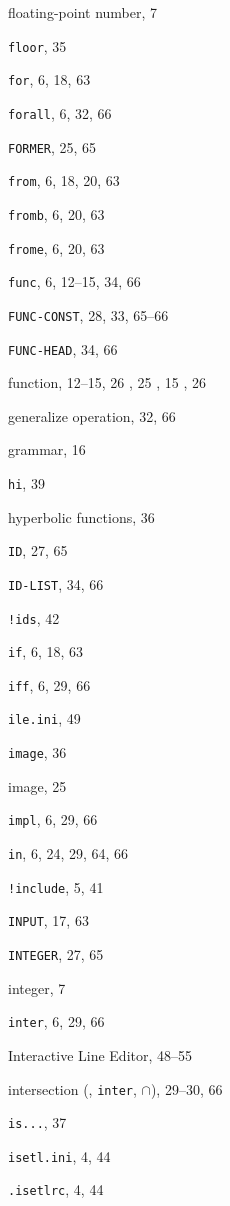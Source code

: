 \begin{theindex}
\item {floating-point number}, 7
\item {{\tt floor}}, 35
\item {{\tt for}}, 6, 18, 63
\item {{\tt forall}}, 6, 32, 66
\item {{\tt FORMER}}, 25, 65
\item {{\tt from}}, 6, 18, 20, 63
\item {{\tt fromb}}, 6, 20, 63
\item {{\tt frome}}, 6, 20, 63
\item {{\tt func}}, 6, 12--15, 34, 66
\item {{\tt FUNC-CONST}}, 28, 33, 65--66
\item {{\tt FUNC-HEAD}}, 34, 66
\item {function}, 12--15, 26
	, 25
	, 15
	, 26
\indexspace
\item {generalize operation}, 32, 66
\item {grammar}, 16
\indexspace
\item {{\tt hi}}, 39
\item {hyperbolic functions}, 36
\indexspace
\item {{\tt ID}}, 27, 65
\item {{\tt ID-LIST}}, 34, 66
\item {{\tt !ids}}, 42
\item {{\tt if}}, 6, 18, 63
\item {{\tt iff}}, 6, 29, 66
\item {{\tt ile.ini}}, 49
\item {{\tt image}}, 36
\item {image}, 25
\item {{\tt impl}}, 6, 29, 66
\item {{\tt in}}, 6, 24, 29, 64, 66
\item {{\tt !include}}, 5, 41
\item {{\tt INPUT}}, 17, 63
\item {{\tt INTEGER}}, 27, 65
\item {integer}, 7
\item {{\tt inter}}, 6, 29, 66
\item {Interactive Line Editor}, 48--55
\item {intersection ({\tt *}, {\tt inter}, \(\cap\))}, 29--30, 66
\item {{\tt is...}}, 37
\item {{\tt isetl.ini}}, 4, 44
\item {{\tt .isetlrc}}, 4, 44

\end{theindex}
